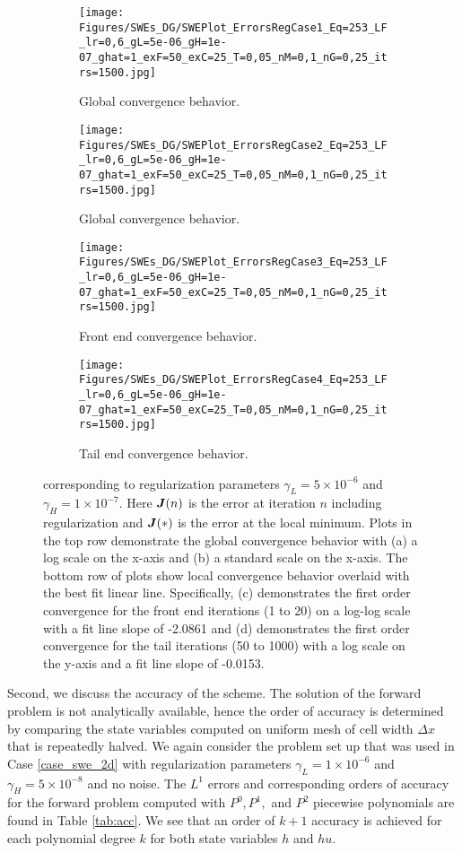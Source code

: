 \begin{figure}[H]
    \begin{subfigure}[t]{0.49\textwidth}
        \centering
        \texttt{[image: Figures/SWEs\_DG/SWEPlot\_ErrorsRegCase1\_Eq=253\_LF\_lr=0,6\_gL=5e-06\_gH=1e-07\_ghat=1\_exF=50\_exC=25\_T=0,05\_nM=0,1\_nG=0,25\_itrs=1500.jpg]}
        \caption{Global convergence behavior.}
    \end{subfigure}
    \begin{subfigure}[t]{0.49\textwidth}
        \centering
        \texttt{[image: Figures/SWEs\_DG/SWEPlot\_ErrorsRegCase2\_Eq=253\_LF\_lr=0,6\_gL=5e-06\_gH=1e-07\_ghat=1\_exF=50\_exC=25\_T=0,05\_nM=0,1\_nG=0,25\_itrs=1500.jpg]}
        \caption{Global convergence behavior.}
    \end{subfigure}
    \begin{subfigure}[t]{0.49\textwidth}
        \texttt{[image: Figures/SWEs\_DG/SWEPlot\_ErrorsRegCase3\_Eq=253\_LF\_lr=0,6\_gL=5e-06\_gH=1e-07\_ghat=1\_exF=50\_exC=25\_T=0,05\_nM=0,1\_nG=0,25\_itrs=1500.jpg]}
        \caption{Front end convergence behavior.}
    \end{subfigure}
    \begin{subfigure}[t]{0.49\textwidth}
        \texttt{[image: Figures/SWEs\_DG/SWEPlot\_ErrorsRegCase4\_Eq=253\_LF\_lr=0,6\_gL=5e-06\_gH=1e-07\_ghat=1\_exF=50\_exC=25\_T=0,05\_nM=0,1\_nG=0,25\_itrs=1500.jpg]}
        \caption{Tail end convergence behavior.}
    \end{subfigure}
    \caption{ corresponding to regularization parameters $\gamma_L = 5 \times 10^{-6}$ and $\gamma_H = 1 \times 10^{-7}$. Here $\bm{J}(n)$ is the error at iteration $n$ including regularization and $\bm{J}(*)$ is the error at the local minimum. Plots in the top row demonstrate the global convergence behavior with (a) a log scale on the x-axis and (b) a standard scale on the x-axis. The bottom row of plots show local convergence behavior overlaid with the best fit linear line. Specifically, (c) demonstrates the first order convergence for the front end iterations (1 to 20) on a log-log scale with a fit line slope of -2.0861 and (d) demonstrates the first order convergence for the tail iterations (50 to 1000) with a log scale on the y-axis and a fit line slope of -0.0153.}
    \label{fig:err_convg_2}
\end{figure}

Second, we discuss the accuracy of the scheme. The solution of the forward problem is not analytically available, hence the order of accuracy is determined by comparing the state variables computed on uniform mesh of cell width $\Delta x$ that is repeatedly halved. We again consider the problem set up that was used in Case \eqref{case_swe_2d} with regularization parameters $\gamma_L = 1 \times 10^{-6}$ and $\gamma_H = 5 \times 10^{-8}$ and no noise. The $L^1$ errors and corresponding orders of accuracy for the forward problem computed with $P^0, P^1,$ and $P^2$ piecewise polynomials are found in Table \ref{tab:acc}. We see that an order of $k+1$ accuracy is achieved for each polynomial degree $k$ for both state variables $h$ and $hu$.

